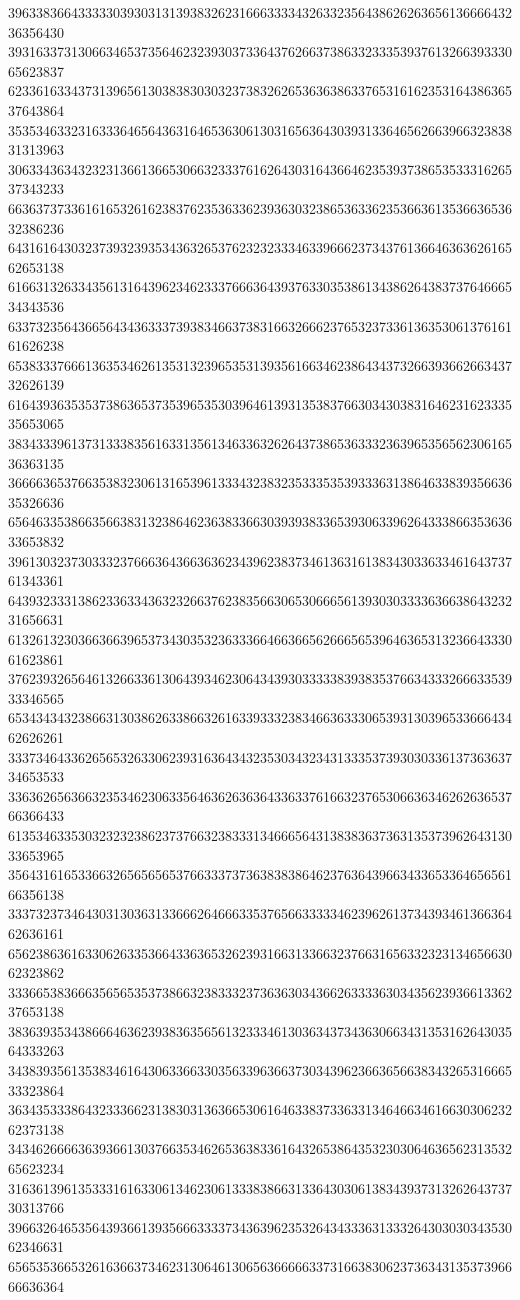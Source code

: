 39633836643333303930313139383262316663333432633235643862626365613666643236356430
39316337313066346537356462323930373364376266373863323335393761326639333065623837
62336163343731396561303838303032373832626536363863376531616235316438636537643864
35353463323163336465643631646536306130316563643039313364656266396632383831313963
30633436343232313661366530663233376162643031643664623539373865353331626537343233
66363737336161653261623837623536336239363032386536336235366361353663653632386236
64316164303237393239353436326537623232333463396662373437613664636362616562653138
61663132633435613164396234623337666364393763303538613438626438373764666534343536
63373235643665643436333739383466373831663266623765323733613635306137616161626238
65383337666136353462613531323965353139356166346238643437326639366266343732626139
61643936353537386365373539653530396461393135383766303430383164623162333535653065
38343339613731333835616331356134633632626437386536333236396535656230616536363135
36666365376635383230613165396133343238323533353539333631386463383935663635326636
65646335386635663831323864623638336630393938336539306339626433386635363633653832
39613032373033323766636436636362343962383734613631613834303363346164373761343361
64393233313862336334363232663762383566306530666561393030333363663864323231656631
61326132303663663965373430353236333664663665626665653964636531323664333061623861
37623932656461326633613064393462306434393033333839383537663433326663353933346565
65343434323866313038626338663261633933323834663633306539313039653366643462626261
33373464336265653263306239316364343235303432343133353739303033613736363734653533
33636265636632353462306335646362636364336337616632376530663634626263653766366433
61353463353032323238623737663238333134666564313838363736313537396264313033653965
35643161653366326565656537663337373638383864623763643966343365336465656166356138
33373237346430313036313366626466633537656633333462396261373439346136636462636161
65623863616330626335366433636532623931663133663237663165633232313465663062323862
33366538366635656535373866323833323736363034366263333630343562393661336237653138
38363935343866646362393836356561323334613036343734363066343135316264303564333263
34383935613538346164306336633035633963663730343962366365663834326531666533323864
36343533386432333662313830313636653061646338373363313464663461663030623262373138
34346266663639366130376635346265363833616432653864353230306463656231353265623234
31636139613533316163306134623061333838663133643030613834393731326264373730313766
39663264653564393661393566633337343639623532643433363133326430303034353062346631
65653536653261636637346231306461306563666663373166383062373634313537396666636364
